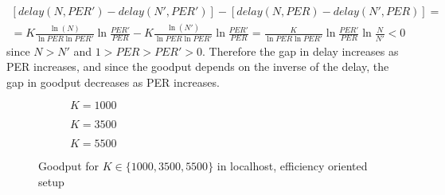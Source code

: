 \begin{equation}
\begin{split}
[delay(N,PER')-delay(N',PER')]-[delay(N,PER)-delay(N',PER)]=\\ 
=K\frac{\ln(N)}{\ln PER \ln PER'}\ln{\frac{PER'}{PER}}-K\frac{\ln(N')}{\ln PER \ln PER'}\ln{\frac{PER'}{PER}}=\frac{K}{\ln PER \ln PER'}\ln{\frac{PER'}{PER}}\ln{\frac{N}{N'}}<0
\end{split}
\end{equation}
since $N>N'$ and $1>PER>PER'>0$. Therefore the gap in delay increases as PER increases, and since the goodput depends on the inverse of the delay, the gap in goodput decreases as PER increases.



\begin{figure}[!hp]
\centering
\begin{subfigure}{0.24\textwidth}
	\captionsetup{justification=centering,font=scriptsize}
	\centering
	\setlength\fwidth{\textwidth}
	\setlength{}
	
	\caption{$K=1000$}
	\label{fig:lh_good_1000_eff}
\end{subfigure}\hspace{2em}%
\begin{subfigure}{0.23\textwidth}
	\captionsetup{justification=centering,font=scriptsize}
	\centering
	\setlength\fwidth{\textwidth}
	\setlength{}
	
	\caption{$K=3500$}
	\label{fig:lh_good_3500_eff}
\end{subfigure}\hspace{2em}%
\begin{subfigure}{0.23\textwidth}
	\captionsetup{justification=centering,font=scriptsize}
	\centering
	\setlength\fwidth{\textwidth}
	\setlength{}
	
	\caption{$K=5500$}
	\label{fig:lh_good_5500_eff}
\end{subfigure}
\caption{Goodput for $K \in \{1000, 3500, 5500\}$ in localhost, efficiency oriented setup}
\label{fig:goodput_nonaggr}
\end{figure}

